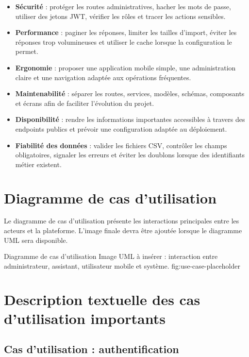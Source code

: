 \begin{itemize}
    \item \textbf{Sécurité} : protéger les routes administratives, hacher les mots de passe, utiliser des jetons JWT,
    vérifier les rôles et tracer les actions sensibles.
    \item \textbf{Performance} : paginer les réponses, limiter les tailles d'import, éviter les réponses trop
    volumineuses et utiliser le cache lorsque la configuration le permet.
    \item \textbf{Ergonomie} : proposer une application mobile simple, une administration claire et une navigation
    adaptée aux opérations fréquentes.
    \item \textbf{Maintenabilité} : séparer les routes, services, modèles, schémas, composants et écrans afin de
    faciliter l'évolution du projet.
    \item \textbf{Disponibilité} : rendre les informations importantes accessibles à travers des endpoints publics
    et prévoir une configuration adaptée au déploiement.
    \item \textbf{Fiabilité des données} : valider les fichiers CSV, contrôler les champs obligatoires, signaler les
    erreurs et éviter les doublons lorsque des identifiants métier existent.
\end{itemize}

\section{Diagramme de cas d'utilisation}

Le diagramme de cas d'utilisation présente les interactions principales entre les acteurs et la plateforme.
L'image finale devra être ajoutée lorsque le diagramme UML sera disponible.

\placeholderfigure
{Diagramme de cas d'utilisation}
{Image UML à insérer : interaction entre administrateur, assistant, utilisateur mobile et système.}
{fig:use-case-placeholder}

\section{Description textuelle des cas d'utilisation importants}

\subsection{Cas d'utilisation : authentification}

